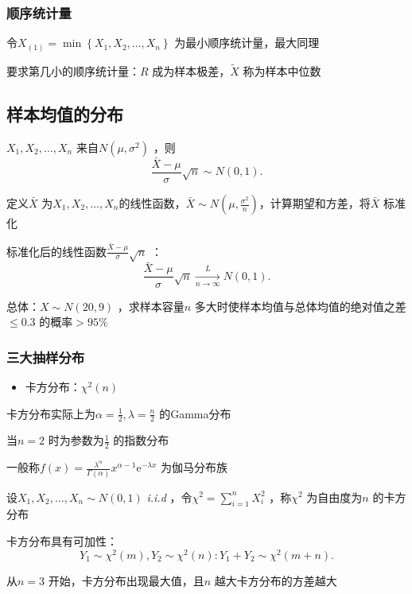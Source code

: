 \subsubsection*{顺序统计量}%
\label{subsub:顺序统计量}
令$X_{\left( 1 \right) }=\min\left\{ X_1,X_2,\ldots ,X_{n} \right\} $ 为最小顺序统计量，最大同理

要求第几小的顺序统计量：$R$ 成为样本极差，$\widetilde{X}$ 称为样本中位数
\subsection{样本均值的分布}%
\label{sub:样本均值的分布}
\begin{thm}
    $X_1,X_2,\ldots ,X_{n}$ 来自$N\left( \mu,\sigma^2 \right) $ ，则\[
        \frac{\bar{X}-\mu}{\sigma} \sqrt{n} \sim N\left( 0,1 \right) 
    .\] 
\end{thm}
定义$\bar{X}$ 为$X_1,X_2,\ldots ,X_{n}$的线性函数，$\bar{X}\sim N\left( \mu,\frac{\sigma^2}{n}  \right) $，计算期望和方差，将$\bar{X}$ 标准化
\begin{thm}
    标准化后的线性函数$\frac{\bar{X}-\mu}{\sigma} \sqrt{n} $ ：
    \[
        \frac{\bar{X}-\mu}{\sigma} \sqrt{n} \xrightarrow[n\to \infty]{L} N\left( 0,1 \right) 
    .\] 
\end{thm}
\begin{eg}
    总体：$X\sim N\left( 20,9 \right) $ ，求样本容量$n$ 多大时使样本均值与总体均值的绝对值之差$\le 0.3$ 的概率$> 95\%$
\end{eg}
\subsubsection{三大抽样分布}%
\label{subsub:三大抽样分布}
\begin{itemize}
    \item 卡方分布：$\chi^2\left( n \right) $
    
\end{itemize}
\begin{notation}
    卡方分布实际上为$\alpha=\frac{1}{2} ,\lambda=\frac{n}{2} $ 的Gamma分布
    
    当$n=2$ 时为参数为$\frac{1}{2} $ 的指数分布
    
    一般称$f\left( x \right) =\frac{\lambda^{\alpha}}{\Gamma\left( \alpha \right) } x^{\alpha-1}\mathrm{e}^{-\lambda x} $ 为伽马分布族
\end{notation}
\begin{defi}
    设$X_1,X_2,\ldots ,X_{n}\sim N\left( 0,1 \right) $ \textit{i.i.d} ，令$\chi^2=\sum_{i=1}^{n} X_{i}^2$ ，称$\chi^2$ 为自由度为$n$ 的卡方分布
\end{defi}
\begin{notation}
    卡方分布具有可加性：\[
        Y_1\sim \chi^2\left( m \right) ,Y_2\sim \chi^2\left( n \right) : Y_1+Y_2\sim \chi^2\left( m+n \right) 
    .\] 
\end{notation}
从$n=3$ 开始，卡方分布出现最大值，且$n$ 越大卡方分布的方差越大

